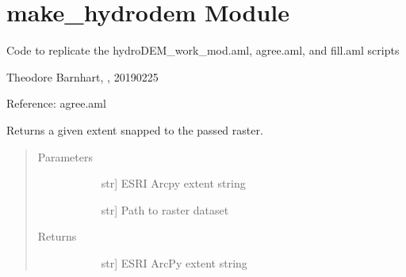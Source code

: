 \documentclass[letterpaper,10pt,english]{sphinxmanual}
\begin{document}
\section{make\_hydrodem Module}
\label{\detokenize{make_hydrodem:module-make_hydrodem}}\label{\detokenize{make_hydrodem:make-hydrodem-module}}\label{\detokenize{make_hydrodem::doc}}
Code to replicate the hydroDEM\_work\_mod.aml, agree.aml, and fill.aml scripts

Theodore Barnhart, , 20190225

Reference: agree.aml

\begin{fulllineitems}
\label{\detokenize{make_hydrodem:make_hydrodem.SnapExtent}}
Returns a given extent snapped to the passed raster.
\begin{quote}\begin{description}
\item[{Parameters}] \leavevmode\begin{description}
\item[{}] \leavevmode{[}str{]}
ESRI Arcpy extent string

\item[{}] \leavevmode{[}str{]}
Path to raster dataset

\end{description}

\item[{Returns}] \leavevmode\begin{description}
\item[{}] \leavevmode{[}str{]}
ESRI ArcPy extent string

\end{description}

\end{description}\end{quote}

\end{fulllineitems}

\end{document}
